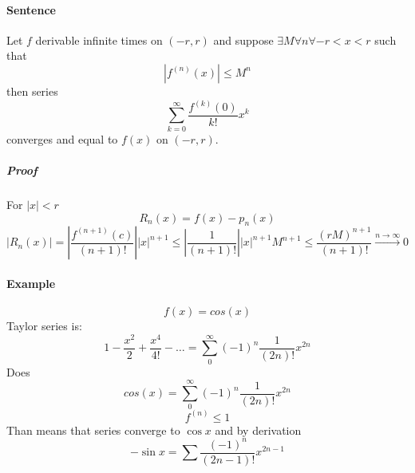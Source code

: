 \paragraph{Sentence}
Let $f$ derivable infinite times on $(-r,r)$ and suppose $\exists M \forall n \forall -r<x<r$ such that
$$\left|f^{(n)}(x)\right|\leq M^n$$
then series
$$\sum_{k=0}^\infty \frac{f^{(k)}(0)}{k!}x^k$$
converges and equal to $f(x)$ on $(-r,r)$.
\subparagraph{Proof}
For $|x|<r$
$$R_n(x) = f(x) - p_n(x)$$
$$\left| R_n(x) \right| = \left|\frac{f^{(n+1)}(c)}{(n+1)!}\right|\left|x\right|^{n+1} \leq \left|\frac{1}{(n+1)!}\right|\left|x\right|^{n+1}M^{n+1} \leq \frac{\left(rM\right)^{n+1}}{(n+1)!} \stackrel{n\to \infty}{\to} 0$$
\paragraph{Example}
$$f(x)=cos(x)$$
Taylor series is:
$$1-\frac{x^2}{2}+\frac{x^4}{4!} - \dots = \sum_0^\infty (-1)^n \frac{1}{(2n)!}x^{2n}$$
Does $$cos(x) = \sum_0^\infty (-1)^n \frac{1}{(2n)!}x^{2n}$$
$$f^{(n)} \leq 1$$
Than means that series converge to $\cos x$ and by derivation
$$-\sin x = \sum\frac{(-1)^n}{(2n-1)!}x^{2n-1}$$